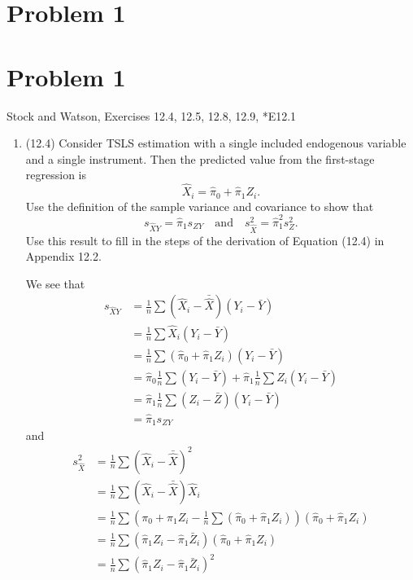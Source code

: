 \documentclass[11pt]{article}
\begin{document}
	

	\psetheader
\section*{Problem 1}

\section*{Problem 1}
Stock and Watson, Exercises 12.4, 12.5, 12.8, 12.9, *E12.1
\begin{enumerate}
    \item (12.4) Consider TSLS estimation with a single included endogenous variable and a single instrument. Then the predicted value from the first-stage regression is 
\[
\hat{X}_i = \hat{\pi}_0 + \hat{\pi}_1 Z_i.
\]
Use the definition of the sample variance and covariance to show that 
\[
s_{\hat{X}Y} = \hat{\pi}_1 s_{ZY} \quad \text{and} \quad s_{\hat{X}}^2 = \hat{\pi}_1^2 s_Z^2.
\]
Use this result to fill in the steps of the derivation of Equation (12.4) in Appendix 12.2.
\begin{solution}
    We see that 
    \begin{align*}
        s_{\hat X Y} &= \frac{1}{n}\sum (\hat X_i - \bar{\hat X})(Y_i - \bar Y)\\
        &=\frac{1}{n}\sum \hat X_i(Y_i - \bar Y)\\
        &= \frac{1}{n}\sum (\hat \pi_0 + \hat \pi_1 Z_i)(Y_i - \bar Y)\\
        &= \hat\pi_0\frac{1}{n}\sum (Y_i - \bar Y) + \hat\pi_1 \frac{1}{n}\sum Z_i(Y_i - \bar Y)\\
        &= \hat\pi_1\frac{1}{n}\sum (Z_i - \bar Z)(Y_i - \bar Y)\\
        &= \hat\pi_1 s_{ZY}
    \end{align*} and
    \begin{align*}
        s^2_{\hat X} &= \frac{1}{n}\sum (\hat X_i - \bar{\hat X})^2\\
        &= \frac{1}{n}\sum (\hat X_i - \bar{\hat X})\hat X_i\\
        &= \frac{1}{n}\sum (\pi_0 + \hat \pi_1 Z_i - \frac{1}{n}\sum (\hat \pi_0 + \hat \pi_1 Z_i))(\hat \pi_0 + \hat \pi_1 Z_i)\\
        &= \frac{1}{n}\sum (\hat \pi_1 Z_i - \hat \pi_1 \bar Z_i)(\hat \pi_0 + \hat \pi_1 Z_i)\\
        &= \frac{1}{n}\sum (\hat \pi_1 Z_i - \hat \pi_1 \bar Z_i)^2\\

\end{align*}
\end{solution}
\end{enumerate}
\end{document}
